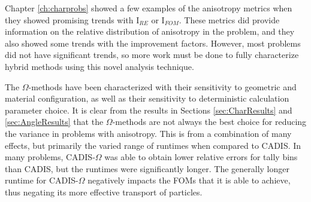 Chapter \ref{ch:charprobs} showed a few examples of the anisotropy metrics when
they showed promising trends with I$_{RE}$ or I$_{FOM}$. These metrics did
provide information on the relative distribution of anisotropy in the problem,
and they also showed some trends with the improvement factors. However, most
problems did not have significant trends, so more work must be done to fully
characterize hybrid methods using this novel analysis technique.

The $\Omega$-methods have been characterized with their sensitivity to
geometric and material configuration, as well as their sensitivity to
deterministic calculation parameter choice. It is clear from the results in
Sections \ref{sec:CharResults} and \ref{sec:AngleResults} that the
$\Omega$-methods are not always the best choice for reducing the variance in
problems with anisotropy.
This is from a combination of many effects, but primarily the varied range of
runtimes when compared to CADIS. In many problems, CADIS-$\Omega$ was able to
obtain lower relative errors for tally bins than CADIS, but the runtimes were
significantly longer. The generally longer runtime for CADIS-$\Omega$
negatively impacts the FOMs that it is able to achieve, thus negating its more
effective transport of particles.
